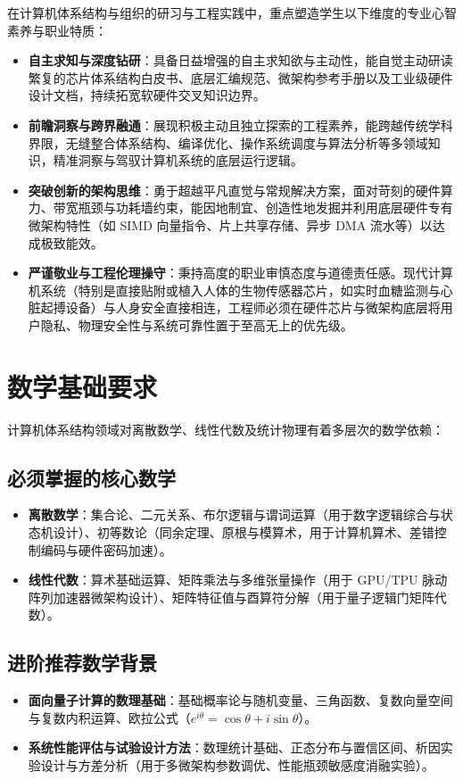 在计算机体系结构与组织的研习与工程实践中，重点塑造学生以下维度的专业心智素养与职业特质：
\begin{itemize}
    \item \textbf{自主求知与深度钻研}：具备日益增强的自主求知欲与主动性，能自觉主动研读繁复的芯片体系结构白皮书、底层汇编规范、微架构参考手册以及工业级硬件设计文档，持续拓宽软硬件交叉知识边界。
    \item \textbf{前瞻洞察与跨界融通}：展现积极主动且独立探索的工程素养，能跨越传统学科界限，无缝整合体系结构、编译优化、操作系统调度与算法分析等多领域知识，精准洞察与驾驭计算机系统的底层运行逻辑。
    \item \textbf{突破创新的架构思维}：勇于超越平凡直觉与常规解决方案，面对苛刻的硬件算力、带宽瓶颈与功耗墙约束，能因地制宜、创造性地发掘并利用底层硬件专有微架构特性（如 SIMD 向量指令、片上共享存储、异步 DMA 流水等）以达成极致能效。
    \item \textbf{严谨敬业与工程伦理操守}：秉持高度的职业审慎态度与道德责任感。现代计算机系统（特别是直接贴附或植入人体的生物传感器芯片，如实时血糖监测与心脏起搏设备）与人身安全直接相连，工程师必须在硬件芯片与微架构底层将用户隐私、物理安全性与系统可靠性置于至高无上的优先级。
\end{itemize}

\section{数学基础要求}

计算机体系结构领域对离散数学、线性代数及统计物理有着多层次的数学依赖：

\subsection{必须掌握的核心数学}
\begin{itemize}
    \item \textbf{离散数学}：集合论、二元关系、布尔逻辑与谓词运算（用于数字逻辑综合与状态机设计）、初等数论（同余定理、原根与模算术，用于计算机算术、差错控制编码与硬件密码加速）。
    \item \textbf{线性代数}：算术基础运算、矩阵乘法与多维张量操作（用于 GPU/TPU 脉动阵列加速器微架构设计）、矩阵特征值与酉算符分解（用于量子逻辑门矩阵代数）。
\end{itemize}

\subsection{进阶推荐数学背景}
\begin{itemize}
    \item \textbf{面向量子计算的数理基础}：基础概率论与随机变量、三角函数、复数向量空间与复数内积运算、欧拉公式（$e^{i\theta} = \cos\theta + i\sin\theta$）。
    \item \textbf{系统性能评估与试验设计方法}：数理统计基础、正态分布与置信区间、析因实验设计与方差分析（用于多微架构参数调优、性能瓶颈敏感度消融实验）。
\end{itemize}

